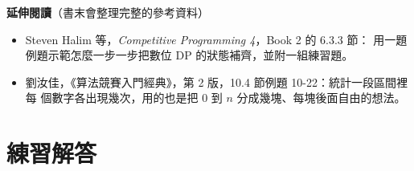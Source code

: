 \textbf{延伸閱讀}（書末會整理完整的參考資料）

\begin{itemize}
\item Steven Halim 等，\textit{Competitive Programming 4}，Book 2 的 6.3.3 節：
用一題例題示範怎麼一步一步把數位 DP 的狀態補齊，並附一組練習題。
\item 劉汝佳，《算法競賽入門經典》，第 2 版，10.4 節例題 10-22：統計一段區間裡每
個數字各出現幾次，用的也是把 $0$ 到 $n$ 分成幾塊、每塊後面自由的想法。
\end{itemize}

\section*{練習解答}

